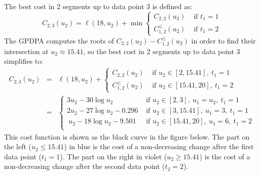\documentclass{article}
\begin{document}
The best cost in 2 segments up to data point 3 is defined as:
\begin{equation}
    C_{2,3}(u_2)=\ell(18, u_2) + \min
                \begin{cases}
                  C_{2,2}(u_2) & \text{ if } t_1=1\\
                  C^\leq_{1,2}(u_2) & \text{ if } t_1=2
                \end{cases}
\end{equation}
The GPDPA computes the roots of $C_{2,2}(u_2)-C^\leq_{1,2}(u_2)$ in
order to find their intersection at $u_2\approx15.41$, so the best
cost in 2 segments up to data point 3 simplifies to:
\begin{eqnarray}
C_{2,3}(u_2)  &=&\ell(18, u_2) + 
                \begin{cases}
                  C_{2,2}(u_2) & \text{ if }u_2\in[2, 15.41],\ t_1=1\\
                  C^\leq_{1,2}(u_2)& \text{ if }u_2\in[15.41, 20],\ t_1=2
                \end{cases}\\
            &=&
                \begin{cases}
                  3u_2 -30 \log u_2 & \text{ if } u_2\in[2,3],\ u_1=u_2,\ t_1=1\\
                  2u_2 -27 \log u_2 -0.296 & \text{ if } u_2\in[3, 15.41],\ u_1=3,\ t_1=1\\\
                  u_2 -18 \log u_2 -9.501  & \text{ if } u_2\in[15.41, 20],\ u_1=6,\ t_1=2\\
                \end{cases}
\end{eqnarray}
This cost function is shown as the black curve in the figure
below. The part on the left ($u_2\leq 15.41$) in blue is the cost of a
non-decreasing change after the first data point ($t_1=1$). The part
on the right in violet ($u_2\geq 15.41$) is the cost of a
non-decreasing change after the second data point ($t_2=2$). 


\end{document}
